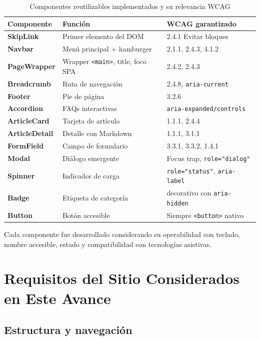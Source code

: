 \documentclass[12pt, a4paper]{article}
\begin{document}
\begin{table}[H]
\centering
\caption{Componentes reutilizables implementados y su relevancia WCAG}
\small
\begin{tabular}{@{}>{\bfseries}p{3cm} p{5cm} p{5.5cm}@{}}
\toprule
\rowcolor{royalblue!12}
\textbf{Componente} & \textbf{Función} & \textbf{WCAG garantizado} \\
\midrule
SkipLink        & Primer elemento del DOM & 2.4.1 Evitar bloques \\
Navbar          & Menú principal + hamburger & 2.1.1, 2.4.3, 4.1.2 \\
PageWrapper     & Wrapper \texttt{<main>}, title, foco SPA & 2.4.2, 2.4.3 \\
Breadcrumb      & Ruta de navegación & 2.4.8, \texttt{aria-current} \\
Footer          & Pie de página & 3.2.6 \\
Accordion       & FAQs interactivas & \texttt{aria-expanded/controls} \\
ArticleCard     & Tarjeta de artículo & 1.1.1, 2.4.4 \\
ArticleDetail   & Detalle con Markdown & 1.1.1, 3.1.1 \\
FormField       & Campo de formulario & 3.3.1, 3.3.2, 1.4.1 \\
Modal           & Diálogo emergente & Focus trap, \texttt{role="dialog"} \\
Spinner         & Indicador de carga & \texttt{role="status"}, \texttt{aria-label} \\
Badge           & Etiqueta de categoría & decorativo con \texttt{aria-hidden} \\
Button          & Botón accesible & Siempre \texttt{<button>} nativo \\
\bottomrule
\end{tabular}
\end{table}

Cada componente fue desarrollado considerando su operabilidad con teclado, nombre accesible, estado y compatibilidad con tecnologías asistivas.

\section{Requisitos del Sitio Considerados en Este Avance}

\subsection{Estructura y navegación}
\end{document}
